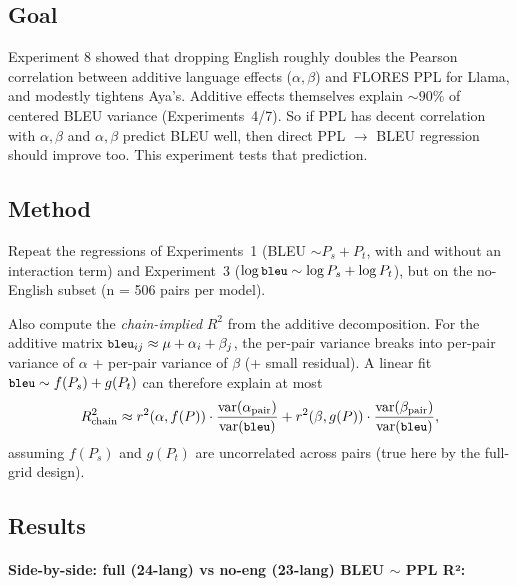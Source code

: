 \documentclass[11pt]{article}
\newcommand{\code}[1]{\texttt{\small #1}}
\begin{document}
\subsection{Goal}

Experiment 8 showed that dropping English roughly doubles the Pearson
correlation between additive language effects ($\alpha, \beta$) and FLORES
PPL for Llama, and modestly tightens Aya's. Additive effects themselves
explain $\sim\!90\%$ of centered BLEU variance (Experiments~4/7). So if
PPL has decent correlation with $\alpha, \beta$ and $\alpha, \beta$
predict BLEU well, then direct PPL $\to$ BLEU regression should improve
too. This experiment tests that prediction.

\subsection{Method}

Repeat the regressions of Experiments~1 (BLEU $\sim P_s + P_t$, with and
without an interaction term) and Experiment~3 ($\log\code{bleu} \sim
\log P_s + \log P_t$), but on the no-English subset (n = 506 pairs per
model).

Also compute the \emph{chain-implied} $R^2$ from the additive
decomposition. For the additive matrix $\code{bleu}_{ij} \approx \mu +
\alpha_i + \beta_j$, the per-pair variance breaks into per-pair variance
of $\alpha$ + per-pair variance of $\beta$ (+ small residual). A linear
fit $\code{bleu} \sim f(P_s) + g(P_t)$ can therefore explain at most
\[
R^2_{\text{chain}} \approx r^2(\alpha, f(P)) \cdot
\frac{\mathrm{var}(\alpha_{\text{pair}})}{\mathrm{var}(\code{bleu})}
+ r^2(\beta, g(P)) \cdot
\frac{\mathrm{var}(\beta_{\text{pair}})}{\mathrm{var}(\code{bleu})},
\]
assuming $f(P_s)$ and $g(P_t)$ are uncorrelated across pairs (true here
by the full-grid design).

\subsection{Results}

\paragraph{Side-by-side: full (24-lang) vs no-eng (23-lang) BLEU $\sim$ PPL R²:}
\end{document}
